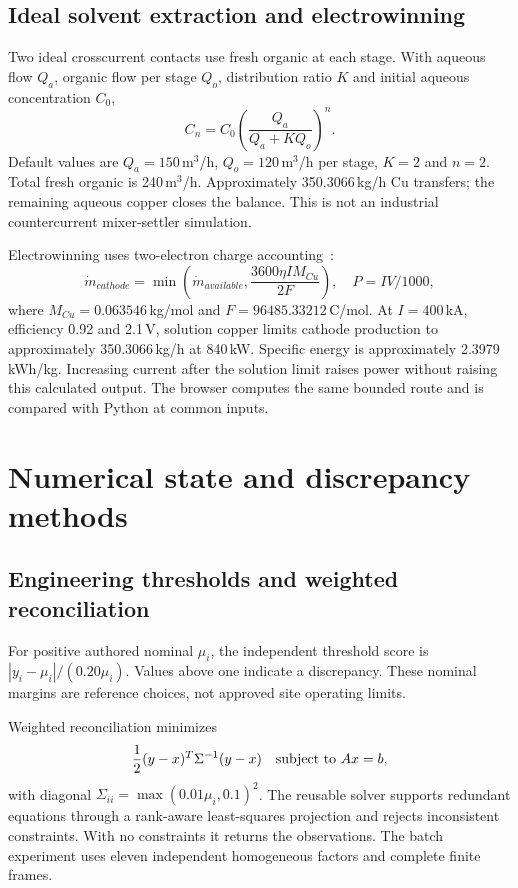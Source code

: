 \documentclass[11pt,a4paper]{article}
\begin{document}
\subsection{Ideal solvent extraction and electrowinning}
Two ideal crosscurrent contacts use fresh organic at each stage. With aqueous flow $Q_a$, organic flow per stage $Q_o$, distribution ratio $K$ and initial aqueous concentration $C_0$,
\begin{equation}
 C_n=C_0\left(\frac{Q_a}{Q_a+KQ_o}\right)^n.
\end{equation}
Default values are $Q_a=150$\,m$^3$/h, $Q_o=120$\,m$^3$/h per stage, $K=2$ and $n=2$. Total fresh organic is 240\,m$^3$/h. Approximately 350.3066\,kg/h Cu transfers; the remaining aqueous copper closes the balance. This is not an industrial countercurrent mixer-settler simulation.

Electrowinning uses two-electron charge accounting~\cite{ew}:
\begin{equation}
 \dot m_{cathode}=\min\left(\dot m_{available},
 \frac{3600\eta I M_{Cu}}{2F}\right),\quad
 P=IV/1000,
\end{equation}
where $M_{Cu}=0.063546$\,kg/mol and $F=96485.33212$\,C/mol. At $I=400$\,kA, efficiency 0.92 and 2.1\,V, solution copper limits cathode production to approximately 350.3066\,kg/h at 840\,kW. Specific energy is approximately 2.3979\,kWh/kg. Increasing current after the solution limit raises power without raising this calculated output. The browser computes the same bounded route and is compared with Python at common inputs.

\section{Numerical state and discrepancy methods}
\subsection{Engineering thresholds and weighted reconciliation}
For positive authored nominal $\mu_i$, the independent threshold score is $|y_i-\mu_i|/(0.20\mu_i)$. Values above one indicate a discrepancy. These nominal margins are reference choices, not approved site operating limits.

Weighted reconciliation minimizes
\begin{equation}
 \frac12(y-x)^T\Sigma^{-1}(y-x)\quad\hbox{subject to }Ax=b,
\end{equation}
with diagonal $\Sigma_{ii}=\max(0.01\mu_i,0.1)^2$. The reusable solver supports redundant equations through a rank-aware least-squares projection and rejects inconsistent constraints. With no constraints it returns the observations. The batch experiment uses eleven independent homogeneous factors and complete finite frames.
\end{document}
